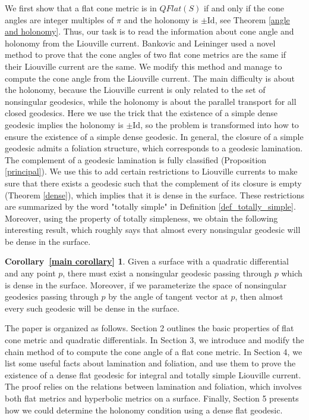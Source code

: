 \documentclass[reqno]{amsart}
\theoremstyle{plain}
\theoremstyle{definition}
\theoremstyle{remark}
\theoremstyle{definition}
\newcommand{\?}{\textcolor{red}{?}}
\newtheorem*{cormain}{Corollary~\ref{main corollary}}
\begin{document}
We first show that a flat cone metric is in $QFlat(S)$ if and only if the cone angles are integer multiples of $\pi$ and the holonomy is $\pm\text{Id}$, see Theorem \ref{angle and holonomy}. Thus, our task is to read the information about cone angle and holonomy from the Liouville current. Bankovic and Leininger used a novel method to prove that the cone angles of two flat cone metrics are the same if their Liouville current are the same. We modify this method and manage to compute the cone angle from the Liouville current. The main difficulty is about the holonomy, because the Liouville current is only related to the set of nonsingular geodesics, while the holonomy is about the parallel transport for all closed geodesics. Here we use the trick that the existence of a simple dense geodesic implies the holonomy is $\pm\text{Id}$, so the problem is transformed into how to ensure the existence of a simple dense geodesic. In general, the closure of a simple geodesic admits a foliation structure, which corresponds to a geodesic lamination. The complement of a geodesic lamination is fully classified (Proposition \ref{principal}). We use this to add certain restrictions to Liouville currents to make sure that there exists a geodesic such that the complement of its closure is empty (Theorem \ref{dense}), which implies that it is dense in the surface. These restrictions are summarized by the word "totally simple" in Definition \ref{def_totally_simple}. Moreover, using the property of totally simpleness, we obtain the following interesting result, which roughly says that almost every nonsingular geodesic will be dense in the surface.
\begin{cormain}
    Given a surface with a quadratic differential and any point $p$, there must exist a nonsingular geodesic passing through $p$ which is dense in the surface. Moreover, if we parameterize the space of nonsingular geodesics passing through $p$ by the angle of tangent vector at $p$, then almost every such geodesic will be dense in the surface.
\end{cormain}

The paper is organized as follows. Section 2 outlines the basic properties of flat cone metric and quadratic differentials. In Section 3, we introduce and modify the chain method of \cite{bankovic2018marked} to compute the cone angle of a flat cone metric. In Section 4, we list some useful facts about lamination and foliation, and use them to prove the existence of a dense flat geodesic for integral and totally simple Liouville current. The proof relies on the relations between lamination and foliation, which involves both flat metrics and hyperbolic metrics on a surface. Finally, Section 5 presents how we could determine the holonomy condition using a dense flat geodesic.
\end{document}
